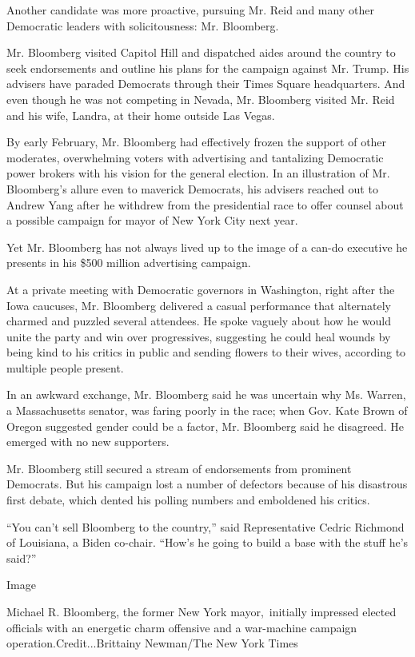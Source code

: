 Another candidate was more proactive, pursuing Mr. Reid and many other
Democratic leaders with solicitousness: Mr. Bloomberg.

Mr. Bloomberg visited Capitol Hill and dispatched aides around the
country to seek endorsements and outline his plans for the campaign
against Mr. Trump. His advisers have paraded Democrats through their
Times Square headquarters. And even though he was not competing in
Nevada, Mr. Bloomberg visited Mr. Reid and his wife, Landra, at their
home outside Las Vegas.

By early February, Mr. Bloomberg had effectively frozen the support of
other moderates, overwhelming voters with advertising and tantalizing
Democratic power brokers with his vision for the general election. In an
illustration of Mr. Bloomberg's allure even to maverick Democrats, his
advisers reached out to Andrew Yang after he withdrew from the
presidential race to offer counsel about a possible campaign for mayor
of New York City next year.

Yet Mr. Bloomberg has not always lived up to the image of a can-do
executive he presents in his \$500 million advertising campaign.

At a private meeting with Democratic governors in Washington, right
after the Iowa caucuses, Mr. Bloomberg delivered a casual performance
that alternately charmed and puzzled several attendees. He spoke vaguely
about how he would unite the party and win over progressives, suggesting
he could heal wounds by being kind to his critics in public and sending
flowers to their wives, according to multiple people present.

In an awkward exchange, Mr. Bloomberg said he was uncertain why Ms.
Warren, a Massachusetts senator, was faring poorly in the race; when
Gov. Kate Brown of Oregon suggested gender could be a factor, Mr.
Bloomberg said he disagreed. He emerged with no new supporters.

Mr. Bloomberg still secured a stream of endorsements from prominent
Democrats. But his campaign lost a number of defectors because of his
disastrous first debate, which dented his polling numbers and emboldened
his critics.

``You can't sell Bloomberg to the country,'' said Representative Cedric
Richmond of Louisiana, a Biden co-chair. ``How's he going to build a
base with the stuff he's said?''

Image

Michael R. Bloomberg, the former New York mayor,~initially impressed
elected officials with an energetic charm offensive and a war-machine
campaign operation.Credit...Brittainy Newman/The New York Times

